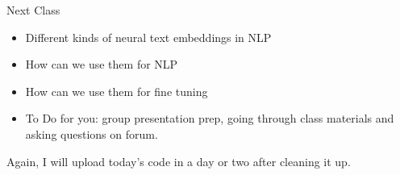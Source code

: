 \documentclass{beamer}
\begin{document}
\begin{frame}{Next Class}
    \begin{itemize}
        \item Different kinds of neural text embeddings in NLP
        \item How can we use them for NLP
        \item How can we use them for fine tuning
        \item To Do for you: group presentation prep, going through class materials and asking questions on forum. 
    \end{itemize}
    Again, I will upload today's code in a day or two after cleaning it up. 
\end{frame}
\end{document}
